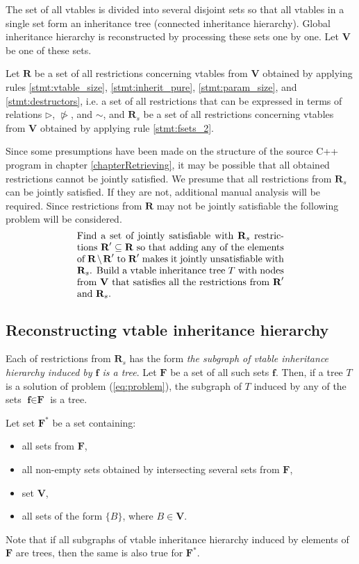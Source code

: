 \documentclass[10pt, conference]{IEEEtran}
\newcommand{\ib}[1]{\textbf{#1}}
\newcommand{\gF}{\ib{F}}
\newcommand{\gR}{\ib{R}}
\newcommand{\gV}{\ib{V}}
\newcommand{\gRs}{\gR_s}
\newcommand{\gf}{\ib{f}}
\newcommand{\gFs}{\gF^*}
\newcommand{\nrhd}{\ntriangleright}
\newcommand{\compact}{}
\begin{document}
The set of all vtables is divided into several disjoint sets
so that all vtables in a single set form an inheritance tree
(connected inheritance hierarchy).
Global inheritance hierarchy is reconstructed by processing these
sets one by one. Let $\gV$ be one of these sets.

Let $\gR$ be a set of all restrictions concerning vtables from $\gV$
obtained by applying rules \ref{stmt:vtable_size},
\ref{stmt:inherit_pure}, \ref{stmt:param_size}, and \ref{stmt:destructors},
i.e. a set of all restrictions that can be expressed in terms of relations
$\rhd$, $\nrhd$, and $\sim$, and $\gRs$ be a set of all restrictions
concerning vtables from $\gV$ obtained by applying rule \ref{stmt:fsets_2}.

Since some presumptions have been made on the structure of the source C++ program in
chapter \ref{chapterRetrieving}, it may be possible that all obtained restrictions cannot
be jointly satisfied. We presume that all restrictions from $\gRs$ can be jointly
satisfied. If they are not, additional manual analysis will be required.
Since restrictions from $\gR$ may not be jointly satisfiable the following problem
will be considered.
\begin{equation}\label{eq:problem}
\begin{minipage}[h]{7.5cm}
Find a set of jointly satisfiable with $\gRs$ restrictions $\gR' \subseteq \gR$ so that adding
any of the elements of $\gR \setminus \gR'$ to $\gR'$ makes it jointly unsatisfiable with $\gRs$.
Build a vtable inheritance tree $T$ with nodes from $\gV$ that satisfies all the
restrictions from $\gR'$ and $\gRs$.
\end{minipage}
\end{equation}



\quad

\subsection{Reconstructing vtable inheritance hierarchy}
\label{chapter:full_reconstruction}

Each of restrictions from $\gRs$ has the form
\textit{the subgraph of vtable inheritance hierarchy induced by {\em $\gf$} is a tree}.
Let $\gF$ be a set of all such sets $\gf$.
Then, if a tree $T$ is a solution of problem (\ref{eq:problem}),
the subgraph of $T$ induced by any of the sets $\gf \in \gF$ is a tree.

Let set $\gFs$ be a set containing:
\begin{itemize}\compact
\item all sets from $\gF$,
\item all non-empty sets obtained by intersecting several sets from $\gF$,
\item set $\gV$,
\item all sets of the form $\{B\}$, where $B \in \gV$.
\end{itemize}
Note that if all subgraphs of vtable inheritance hierarchy induced by elements of
$\gF$ are trees, then the same is also true for $\gFs$.
\end{document}
